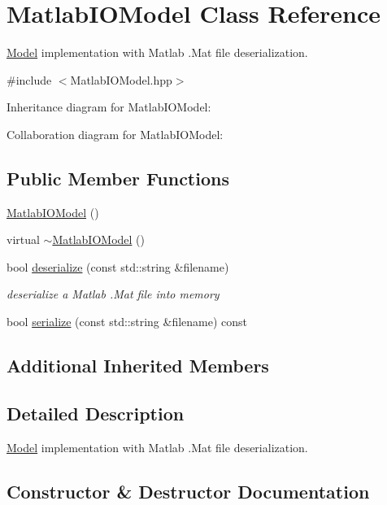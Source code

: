 \hypertarget{classMatlabIOModel}{}\section{Matlab\+I\+O\+Model Class Reference}
\label{classMatlabIOModel}


\hyperlink{classModel}{Model} implementation with Matlab .Mat file deserialization.  




{\ttfamily \#include $<$Matlab\+I\+O\+Model.\+hpp$>$}



Inheritance diagram for Matlab\+I\+O\+Model\+:


Collaboration diagram for Matlab\+I\+O\+Model\+:
\subsection*{Public Member Functions}
\begin{DoxyCompactItemize}
\item 
\hyperlink{classMatlabIOModel_ac4e387c6665a094f985b0ca0c37b1aee}{Matlab\+I\+O\+Model} ()
\item 
virtual \hyperlink{classMatlabIOModel_ac47ddec68b26241297c266b248c856d6}{$\sim$\+Matlab\+I\+O\+Model} ()
\item 
bool \hyperlink{classMatlabIOModel_a223538821bf7944a26433f7f99017f8b}{deserialize} (const std\+::string \&filename)
\begin{DoxyCompactList}\small\item\em deserialize a Matlab .Mat file into memory \end{DoxyCompactList}\item 
bool \hyperlink{classMatlabIOModel_ad67a1237af4a4e4d736599e6f2474252}{serialize} (const std\+::string \&filename) const 
\end{DoxyCompactItemize}
\subsection*{Additional Inherited Members}


\subsection{Detailed Description}
\hyperlink{classModel}{Model} implementation with Matlab .Mat file deserialization. 

\subsection{Constructor \& Destructor Documentation}
\hypertarget{classMatlabIOModel_ac4e387c6665a094f985b0ca0c37b1aee}{}

